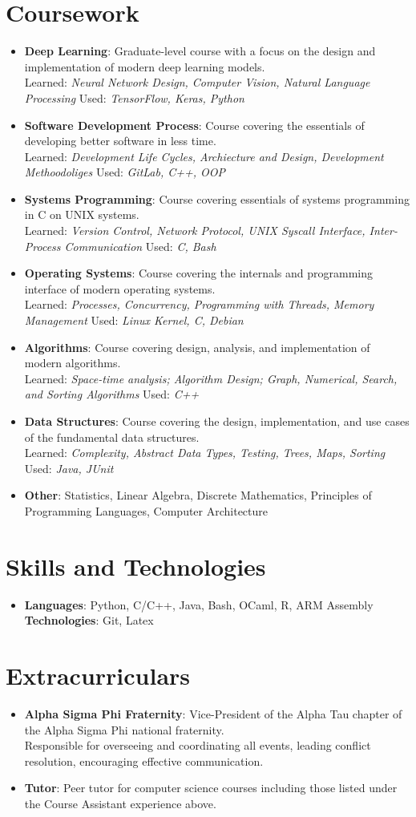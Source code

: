 \documentclass[letterpaper,11pt]{article}
\newcommand{\resumeItem}[2]{
  \item\small{
    \textbf{#1}{: #2 \vspace{-2pt}}
  }
}
\newcommand{\resumeSubItem}[2]{\resumeItem{#1}{#2}\vspace{-4pt}}
\newcommand{\resumeItemListStart}{ \begin{itemize}[leftmargin=*] }
\newcommand{\resumeItemListEnd}{ \end{itemize} }
\begin{document}
\section{Coursework}
  \resumeItemListStart
    \resumeSubItem{Deep Learning}
    {Graduate-level course with a focus on the design and implementation of modern deep learning models. \\ Learned: \emph{Neural Network Design, Computer Vision, Natural Language Processing} \hfill Used: \emph{TensorFlow, Keras, Python}}
    \resumeSubItem{Software Development Process} 
    {Course covering the essentials of developing better software in less time. \\ Learned: \emph{Development Life Cycles, Archiecture and Design, Development Methoodoliges} \hfill Used: \emph{GitLab, C++, OOP}}
    \resumeSubItem{Systems Programming}
    {Course covering essentials of systems programming in C on UNIX systems. \\ Learned: \emph{Version Control, Network Protocol, UNIX Syscall Interface, Inter-Process Communication} \hfill Used: \emph{C, Bash}}
    \resumeSubItem{Operating Systems}
    {Course covering the internals and programming interface of modern operating systems. \\ Learned: \emph{Processes, Concurrency, Programming with Threads, Memory Management} \hfill Used: \emph{Linux Kernel, C, Debian}}
    \resumeSubItem{Algorithms}
    {Course covering design, analysis, and implementation of modern algorithms. \\ Learned: \emph{Space-time analysis; Algorithm Design; Graph, Numerical, Search, and Sorting Algorithms} \hfill Used: \emph{C++}}
    \resumeSubItem{Data Structures}
    {Course covering the design, implementation, and use cases of the fundamental data structures. \\ Learned: \emph{Complexity, Abstract Data Types, Testing, Trees, Maps, Sorting} \hfill Used: \emph{Java, JUnit}}
    \resumeSubItem{Other}
    {Statistics, Linear Algebra, Discrete Mathematics, Principles of Programming Languages, Computer Architecture}
  \resumeItemListEnd


\section{Skills and Technologies}
  \resumeItemListStart
    \item{
      \textbf{Languages}{: Python, C/C++, Java, Bash, OCaml, R, ARM Assembly}
      \hfill
      \textbf{Technologies}{: Git, Latex}
    }
  \resumeItemListEnd


\section{Extracurriculars}
  \resumeItemListStart
    \resumeSubItem{Alpha Sigma Phi Fraternity}
    {Vice-President of the Alpha Tau chapter of the Alpha Sigma Phi national fraternity. \\
    Responsible for overseeing and coordinating all events, leading conflict resolution, encouraging effective communication.}
    \resumeSubItem{Tutor}
    {Peer tutor for computer science courses including those listed under the Course Assistant experience above.}
  \resumeItemListEnd
\end{document}
